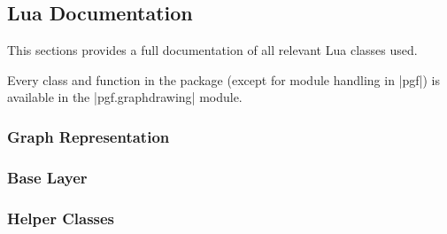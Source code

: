 \subsection{Lua Documentation}
This sections provides a full documentation of all relevant Lua classes
used.

Every class and function in the package (except for module handling in
|pgf|) is available in the |pgf.graphdrawing| module.

\label{section-library-graphdrawing-lua-documentation}
\subsubsection{Graph Representation}
\label{section-library-graphdrawing-lua-documentation-graphrep}





%

\subsubsection{Base Layer}

\label{section-library-graphdrawing-lua-documentation-interface}

\label{section-library-graphdrawing-lua-documentation-sys}


\subsubsection{Helper Classes}

